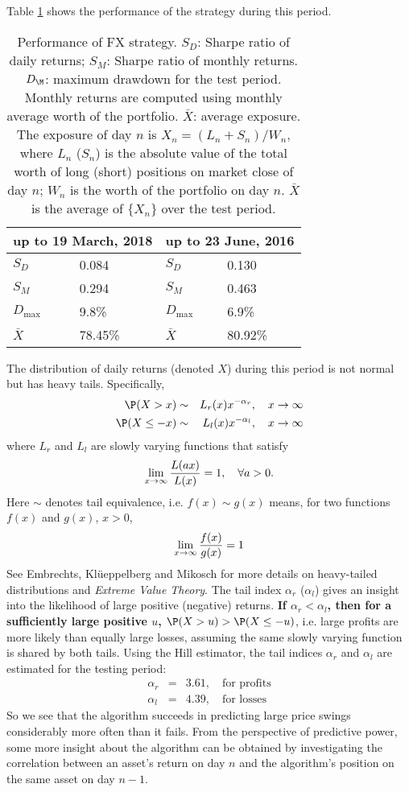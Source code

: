 \documentclass[12pt]{article}
\begin{document}
Table \ref{tab:fx1} shows the performance of the strategy during this
period.
\begin{table}[htb!]
  \centering
  \begin{tabular}{ll||ll}
    \multicolumn{2}{c||}{up to 19 March, 2018}
    & \multicolumn{2}{c}{up to 23 June, 2016} \\
    \hline
    $S_D$ & 0.084 & $S_D$ & 0.130 \\
    $S_M$ & 0.294 & $S_M$ & 0.463 \\
    $D_{\text{max}}$ & 9.8\% & $D_{\text{max}}$ & 6.9\% \\
    $\bar X$ & 78.45\% & $\bar X$ & 80.92\% \\
  \end{tabular}
  \caption{Performance of FX strategy. $S_D$: Sharpe ratio of daily
    returns; $S_M$: Sharpe ratio of monthly returns. $D_\M$:
    maximum drawdown for the test period. Monthly returns are computed
    using monthly average worth of the portfolio. $\bar X$: average
    exposure. The exposure of day $n$ is $X_n = (L_n + S_n)/W_n$,
    where $L_n$ ($S_n$) is the absolute value of the total worth of
    long (short) positions on market close of day $n$; $W_n$ is the
    worth of the portfolio on day $n$. $\bar X$ is the average of
    $\{X_n\}$ over the test period.
  }
  \label{tab:fx1}
\end{table}
The distribution of daily returns (denoted $X$) during this period is
not normal but has heavy tails. Specifically,
\begin{eqnarray*}
  \P(X > x) &\sim& L_r(x) x^{-\alpha_r}, \quad x \to \infty \\
  \P(X \leq -x) &\sim& L_l(x) x^{-\alpha_l}, \quad x \to \infty
\end{eqnarray*}
where $L_r$ and $L_l$ are slowly varying functions that satisfy
\[
  \lim_{x \to \infty} {L(a x) \over L(x)} = 1, \quad \forall a > 0.
\]
Here $\sim$ denotes tail equivalence, i.e. $f(x) \sim g(x)$ means, for
two functions $f(x)$ and $g(x)$, $x > 0$,
\[
  \lim_{x \to \infty} {f(x) \over g(x)} = 1
\]
See Embrechts, Kl\"ueppelberg and Mikosch
\cite{embrechts:klueppelberg:mikosch:1997} for more details on
heavy-tailed distributions and {\it Extreme Value Theory}. The tail
index $\alpha_r$ ($\alpha_l$) gives an insight into the likelihood
of large positive (negative) returns. {\bf If $\alpha_r < \alpha_l$,
  then for a sufficiently large positive $u$, $\P(X > u) > \P(X \leq -u)$},
i.e. large profits are more likely than equally large losses,
assuming the same slowly varying function is shared by both
tails. Using the Hill estimator, the tail indices $\alpha_r$ and
$\alpha_l$ are estimated for the testing period:
\begin{eqnarray*}
  \alpha_r &=& 3.61, \quad \text{for profits} \\
  \alpha_l &=& 4.39, \quad \text{for losses}
\end{eqnarray*}
So we see that the algorithm succeeds in predicting large price swings
considerably more often than it fails. From the perspective of
predictive power, some more insight about the algorithm can be
obtained by investigating the correlation between an asset's return
on day $n$ and the algorithm's position on the same asset on day
$n-1$.
\end{document}
